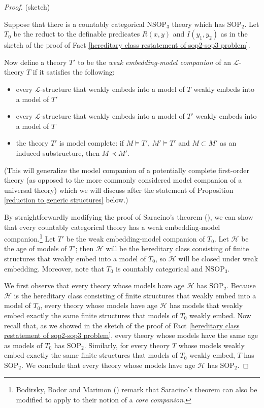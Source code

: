 \documentclass{amsart}
\theoremstyle{definition}
\theoremstyle{remark}
\numberwithin{equation}{section}
\begin{document}
\begin{proof}(sketch)

    Suppose that there is a countably categorical $\mathrm{NSOP}_{3}$ theory which has $\mathrm{SOP}_{2}$. Let $T_{0}$ be the reduct to the definable predicates $R(x, y)$ and $I(y_{1}, y_{2})$ as in the sketch of the proof of Fact \ref{hereditary class restatement of sop2-sop3 problem}.



Now define a theory $T'$ to be the \textit{weak embedding-model companion} of an $\mathcal{L}$-theory $T$ if it satisfies the following:

    \begin{itemize}
    \item every $\mathcal{L}$-structure that weakly embeds into a model of $T$ weakly embeds into a model of $T'$

    \item every $\mathcal{L}$-structure that weakly embeds into a model of $T'$ weakly embeds into a model of $T$

    \item the theory $T'$ is model complete: if $M \models T'$, $M' \models T'$ and $M \subset M'$ as an induced substructure, then $M \prec M'$.
\end{itemize}

(This will generalize the model companion of a potentially complete first-order theory (as opposed to the more commonly considered model companion of a universal theory) which we will discuss after the statement of Proposition \ref{reduction to generic structures} below.)


By straightforwardly modifying the proof of  Saracino's theorem (\cite{Saracino73}), we can show that every countably categorical theory has a weak embedding-model companion.\footnote{Bodirsky, Bodor and Marimon (\cite{BBM25}) remark that Saracino's theorem can also be modified to apply to their notion of a \textit{core companion}.} Let $T'$ be the weak embedding-model companion of $T_{0}$. Let $\mathcal{H}$ be the age of models of $T'$; then $\mathcal{H}$ will be the hereditary class consisting of finite structures that weakly embed into a model of $T_{0}$, so $\mathcal{H}$ will be closed under weak embedding. Moreover, note that $T_{0}$ is countably categorical and $\mathrm{NSOP}_{3}$.


We first observe that every theory whose models have age $\mathcal{H}$ has $\mathrm{SOP}_{2}$. Because $\mathcal{H}$ is the hereditary class consisting of finite structures that weakly embed into a model of $T_{0}$, every theory whose models have age $\mathcal{H}$ has models that weakly embed exactly the same finite structures that models of $T_{0}$ weakly embed. Now recall that, as we showed in the sketch of the proof of Fact \ref{hereditary class restatement of sop2-sop3 problem}, every theory whose models have the same age as models of $T_{0}$ has $\mathrm{SOP}_{2}$. Similarly, for every theory $T$ whose models weakly embed exactly the same finite structures that models of $T_{0}$ weakly embed, $T$ has $\mathrm{SOP}_{2}$. We conclude that every theory whose models have age $\mathcal{H}$ has $\mathrm{SOP}_{2}$.


\end{proof}
\end{document}
